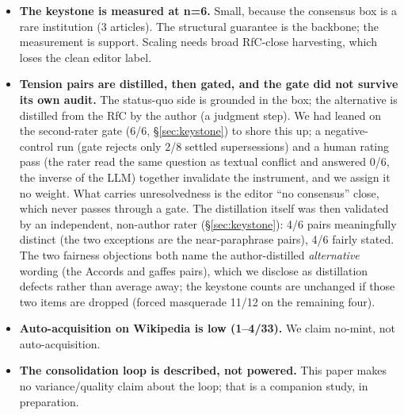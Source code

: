 \documentclass[11pt]{article}
\begin{document}
\begin{itemize}
  ideas. A reviewer who knows ElephantBroker will press hardest here; \S\ref{sec:related} carries the full
  defense (its split is LLM-extracted and confidence-decayed, exactly the model-dependence
  \S\ref{sec:keystone} measures).
\item \textbf{The keystone is measured at n=6.} Small, because the consensus box is a rare institution
  (3 articles). The structural guarantee is the backbone; the measurement is support. Scaling
  needs broad RfC-close harvesting, which loses the clean editor label.
\item \textbf{Tension pairs are distilled, then gated, and the gate did not survive its own audit.}
  The status-quo side is grounded in the box; the alternative is distilled from the RfC by
  the author (a judgment step). We had leaned on the second-rater gate (6/6, \S\ref{sec:keystone}) to shore
  this up; a negative-control run (gate rejects only 2/8 settled supersessions) and a human
  rating pass (the rater read the same question as textual conflict and answered 0/6, the
  inverse of the LLM) together invalidate the instrument, and we assign it no weight. What
  carries unresolvedness is the editor ``no consensus'' close, which never passes through a
  gate. The distillation itself was then validated by an independent, non-author rater
  (\S\ref{sec:keystone}): 4/6 pairs meaningfully distinct (the two exceptions are the near-paraphrase
  pairs), 4/6 fairly stated. The two fairness objections both name the author-distilled
  \emph{alternative} wording (the Accords and gaffes pairs), which we disclose as distillation
  defects rather than average away; the keystone counts are unchanged if those two items
  are dropped (forced masquerade 11/12 on the remaining four).
\item \textbf{Auto-acquisition on Wikipedia is low (1--4/33).} We claim no-mint, not auto-acquisition.
\item \textbf{The consolidation loop is described, not powered.} This paper makes no variance/quality
  claim about the loop; that is a companion study, in preparation.
\end{itemize}
\end{document}

